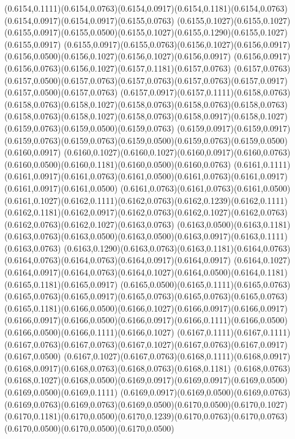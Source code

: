 (0.6154,0.1111)(0.6154,0.0763)(0.6154,0.0917)(0.6154,0.1181)(0.6154,0.0763)(0.6154,0.0917)(0.6154,0.0917)(0.6155,0.0763)
(0.6155,0.1027)(0.6155,0.1027)(0.6155,0.0917)(0.6155,0.0500)(0.6155,0.1027)(0.6155,0.1290)(0.6155,0.1027)(0.6155,0.0917)
(0.6155,0.0917)(0.6155,0.0763)(0.6156,0.1027)(0.6156,0.0917)(0.6156,0.0500)(0.6156,0.1027)(0.6156,0.1027)(0.6156,0.0917)
(0.6156,0.0917)(0.6156,0.0763)(0.6156,0.1027)(0.6157,0.1181)(0.6157,0.0763)
\PST@Solid(0.6157,0.0763)(0.6157,0.0500)(0.6157,0.0763)(0.6157,0.0763)(0.6157,0.0763)(0.6157,0.0917)(0.6157,0.0500)(0.6157,0.0763)
(0.6157,0.0917)(0.6157,0.1111)(0.6158,0.0763)(0.6158,0.0763)(0.6158,0.1027)(0.6158,0.0763)(0.6158,0.0763)(0.6158,0.0763)
(0.6158,0.0763)(0.6158,0.1027)(0.6158,0.0763)(0.6158,0.0917)(0.6158,0.1027)(0.6159,0.0763)(0.6159,0.0500)(0.6159,0.0763)
(0.6159,0.0917)(0.6159,0.0917)(0.6159,0.0763)(0.6159,0.0763)(0.6159,0.0500)(0.6159,0.0763)(0.6159,0.0500)(0.6160,0.0917)
(0.6160,0.1027)(0.6160,0.1027)(0.6160,0.0917)(0.6160,0.0763)(0.6160,0.0500)(0.6160,0.1181)(0.6160,0.0500)(0.6160,0.0763)
(0.6161,0.1111)(0.6161,0.0917)(0.6161,0.0763)(0.6161,0.0500)(0.6161,0.0763)(0.6161,0.0917)(0.6161,0.0917)(0.6161,0.0500)
(0.6161,0.0763)(0.6161,0.0763)(0.6161,0.0500)(0.6161,0.1027)(0.6162,0.1111)(0.6162,0.0763)(0.6162,0.1239)(0.6162,0.1111)
(0.6162,0.1181)(0.6162,0.0917)(0.6162,0.0763)(0.6162,0.1027)(0.6162,0.0763)(0.6162,0.0763)(0.6162,0.1027)(0.6163,0.0763)
(0.6163,0.0500)(0.6163,0.1181)(0.6163,0.0763)(0.6163,0.0500)(0.6163,0.0500)(0.6163,0.0917)(0.6163,0.1111)(0.6163,0.0763)
(0.6163,0.1290)(0.6163,0.0763)(0.6163,0.1181)(0.6164,0.0763)(0.6164,0.0763)(0.6164,0.0763)(0.6164,0.0917)(0.6164,0.0917)
(0.6164,0.1027)(0.6164,0.0917)(0.6164,0.0763)(0.6164,0.1027)(0.6164,0.0500)(0.6164,0.1181)(0.6165,0.1181)(0.6165,0.0917)
(0.6165,0.0500)(0.6165,0.1111)(0.6165,0.0763)(0.6165,0.0763)(0.6165,0.0917)(0.6165,0.0763)(0.6165,0.0763)(0.6165,0.0763)
(0.6165,0.1181)(0.6166,0.0500)(0.6166,0.1027)(0.6166,0.0917)(0.6166,0.0917)
\PST@Solid(0.6166,0.0917)(0.6166,0.0500)(0.6166,0.0917)(0.6166,0.1111)(0.6166,0.0500)(0.6166,0.0500)(0.6166,0.1111)(0.6166,0.1027)
(0.6167,0.1111)(0.6167,0.1111)(0.6167,0.0763)(0.6167,0.0763)(0.6167,0.1027)(0.6167,0.0763)(0.6167,0.0917)(0.6167,0.0500)
(0.6167,0.1027)(0.6167,0.0763)(0.6168,0.1111)(0.6168,0.0917)(0.6168,0.0917)(0.6168,0.0763)(0.6168,0.0763)(0.6168,0.1181)
(0.6168,0.0763)(0.6168,0.1027)(0.6168,0.0500)(0.6169,0.0917)(0.6169,0.0917)(0.6169,0.0500)(0.6169,0.0500)(0.6169,0.1111)
(0.6169,0.0917)(0.6169,0.0500)(0.6169,0.0763)(0.6169,0.0763)(0.6169,0.0763)(0.6169,0.0500)(0.6170,0.0500)(0.6170,0.1027)
(0.6170,0.1181)(0.6170,0.0500)(0.6170,0.1239)(0.6170,0.0763)(0.6170,0.0763)(0.6170,0.0500)(0.6170,0.0500)(0.6170,0.0500)
